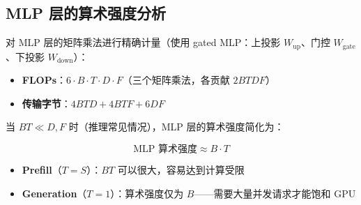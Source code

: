 \subsection{MLP 层的算术强度分析}

对 MLP 层的矩阵乘法进行精确计量（使用 gated MLP：上投影 $W_\text{up}$、门控 $W_\text{gate}$、下投影 $W_\text{down}$）：

\begin{itemize}
    \item \textbf{FLOPs}：$6 \cdot B \cdot T \cdot D \cdot F$（三个矩阵乘法，各贡献 $2BTDF$）
    \item \textbf{传输字节}：$4BTD + 4BTF + 6DF$
\end{itemize}

当 $BT \ll D, F$ 时（推理常见情况），MLP 层的算术强度简化为：

$$\text{MLP 算术强度} \approx B \cdot T$$

\begin{itemize}
    \item \textbf{Prefill}（$T = S$）：$BT$ 可以很大，容易达到计算受限
    \item \textbf{Generation}（$T = 1$）：算术强度仅为 $B$——需要大量并发请求才能饱和 GPU
\end{itemize}

